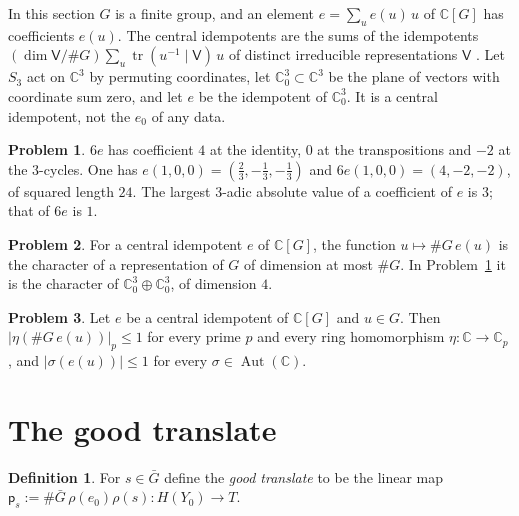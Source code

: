 \documentclass[reqno]{amsart}
\theoremstyle{definition}
\newtheorem{problem}{Problem}[section]
\theoremstyle{plain}
\theoremstyle{definition}
\newtheorem{definition}[theorem]{Definition}
\newcommand{\C}{\mathbb{C}}
\newcommand{\Gb}{\bar G}
\newcommand{\Aut}{\operatorname{Aut}}
\newcommand{\ps}{\mathsf p_s}
\begin{document}
In this section \(G\) is a finite group, and an element \(e = \sum_u e(u)\,u\) of \(\C[G]\) has coefficients \(e(u)\).  The central idempotents are the sums of the idempotents \((\dim\mathsf V/\#G)\sum_u \operatorname{tr}(u^{-1}\mid\mathsf V)\,u\) of distinct irreducible representations \(\mathsf V\) \cite{Se}.  Let \(S_3\) act on \(\C^3\) by permuting coordinates, let \(\C^3_0 \subset \C^3\) be the plane of vectors with coordinate sum zero, and let \(e\) be the idempotent of \(\C^3_0\).  It is a central idempotent, not the \(e_0\) of any data.

\begin{problem}\label{pr:s3}
\(6e\) has coefficient \(4\) at the identity, \(0\) at the transpositions and \(-2\) at the \(3\)-cycles.  One has \(e(1, 0, 0) = (\tfrac23, -\tfrac13, -\tfrac13)\) and \(6e(1, 0, 0) = (4, -2, -2)\), of squared length \(24\).  The largest \(3\)-adic absolute value of a coefficient of \(e\) is \(3\); that of \(6e\) is \(1\).
\end{problem}

\begin{problem}\label{pr:character}
For a central idempotent \(e\) of \(\C[G]\), the function \(u \mapsto \#G\,e(u)\) is the character of a representation of \(G\) of dimension at most \(\#G\).  In Problem~\ref{pr:s3} it is the character of \(\C^3_0 \oplus \C^3_0\), of dimension \(4\).
\end{problem}

\begin{problem}\label{pr:coeff-bounds}
Let \(e\) be a central idempotent of \(\C[G]\) and \(u \in G\).  Then \(\lvert\eta(\#G\,e(u))\rvert_p \le 1\) for every prime \(p\) and every ring homomorphism \(\eta\colon\C\to\C_p\), and \(\lvert\sigma(e(u))\rvert \le 1\) for every \(\sigma \in \Aut(\C)\).
\end{problem}

\section{The good translate}\label{sec:good}

\begin{definition}\label{def:good-translate}
For \(s \in \Gb\) define the \emph{good translate} to be the linear map \(\ps := \#\Gb\,\rho(e_0)\rho(s)\colon H(Y_0) \to T\).
\end{definition}
\end{document}
